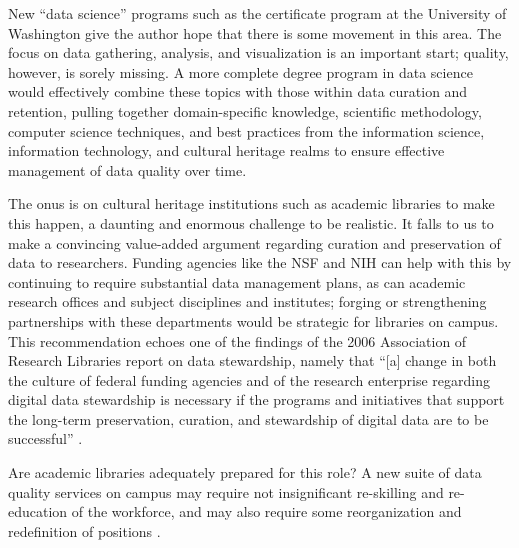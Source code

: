 \documentclass{acm_proc_article-sp}
\begin{document}
New ``data science'' programs such as the certificate program at the
University of Washington \cite{uw:datascience} give the author hope
that there is some movement in this area. The focus on data gathering,
analysis, and visualization is an important start; quality, however,
is sorely missing. A more complete degree program in data science
would effectively combine these topics with those within data curation
and retention, pulling together domain-specific knowledge, scientific
methodology, computer science techniques, and best practices from the
information science, information technology, and cultural heritage
realms to ensure effective management of data quality over time.

The onus is on cultural heritage institutions such as academic
libraries to make this happen, a daunting and enormous challenge to be
realistic. It falls to us to make a convincing value-added argument
regarding curation and preservation of data to researchers. Funding
agencies like the NSF and NIH can help with this by continuing to
require substantial data management plans, as can academic research
offices and subject disciplines and institutes; forging or
strengthening partnerships with these departments would be strategic
for libraries on campus. This recommendation echoes one of the
findings of the 2006 Association of Research Libraries report on data
stewardship, namely that ``[a] change in both the culture of federal
funding agencies and of the research enterprise regarding digital data
stewardship is necessary if the programs and initiatives that support
the long-term preservation, curation, and stewardship of digital data
are to be successful'' \cite{arl:stewardship}.

%

Are academic libraries adequately prepared for this role?  A new suite
of data quality services on campus may require not insignificant
re-skilling and re-education of the workforce, and may also require
some reorganization and redefinition of positions \cite{jisc:deluge}.

%
\end{document}
